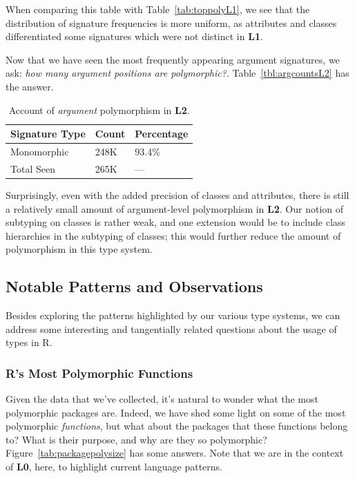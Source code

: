 \documentclass[acmsmall,10pt,review,anonymous]{acmart}\settopmatter{printfolios=true,printccs=false,printacmref=false}
\begin{document}
When comparing this table with Table~\ref{tab:toppolyL1}, we see that the distribution of signature frequencies is more uniform, as attributes and classes differentiated some signatures which were not distinct in {\bf L1}.

Now that we have seen the most frequently appearing argument signatures, we ask: {\it how many argument positions are polymorphic?}.
Table~\ref{tbl:argcountsL2} has the answer.

\begin{table}[ht]
\label{tab:argcountsL2}
\centering
\begin{tabular}{lll}
  \hline
Signature Type & Count & Percentage \\ 
  \hline
  Monomorphic & 248K & 93.4\% \\ 
  Total Seen & 265K & --- \\ 
   \hline
\end{tabular}
\caption{Account of {\it argument} polymorphism in {\bf L2}.}
\end{table}

Surprisingly, even with the added precision of classes and attributes, there is still a relatively small amount of argument-level polymorphism in {\bf L2}.
Our notion of subtyping on classes is rather weak, and one extension would be to include class hierarchies in the subtyping of classes;
this would further reduce the amount of polymorphism in this type system.



%
%
%
%
\subsection{Notable Patterns and Observations}

Besides exploring the patterns highlighted by our various type systems, we can address some interesting and tangentially related questions about the usage of types in R.

%
%
%
%
\subsubsection{R's Most Polymorphic Functions}

Given the data that we've collected, it's natural to wonder what the most polymorphic packages are.
Indeed, we have shed some light on some of the most polymorphic {\it functions}, but what about the packages that these functions belong to?
What is their purpose, and why are they so polymorphic?
Figure~\ref{tab:packagepolysize} has some answers.
Note that we are in the context of {\bf L0}, here, to highlight current language patterns.
\end{document}
